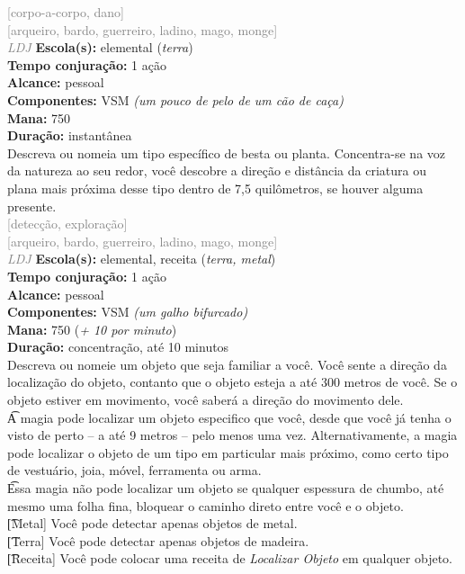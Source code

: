 \documentclass{RPG_Adventure}[2021/10/20]
\begin{document}
{\scriptsize \textcolor{gray}{[corpo-a-corpo, dano]\\}}
{\scriptsize \textcolor{gray}{[arqueiro, bardo, guerreiro, ladino, mago, monge]\\}}
{\tiny \textcolor{gray}{\textit{LDJ}}}\jump{}
{\small \t \textbf{Escola(s):} elemental (\textit{terra})\\\t \textbf{Tempo conjuração:} 1 ação\\\t \textbf{Alcance:} pessoal\\\t \textbf{Componentes:} VSM \textit{(um pouco de pelo de um cão de caça)}\\\t \textbf{Mana:} 750\\\t \textbf{Duração:} instantânea\\}
{\normalsize Descreva ou nomeia um tipo específico de besta ou planta. Concentra-se na voz da natureza ao seu redor, você descobre a direção e distância da criatura ou plana mais próxima desse tipo dentro de 7,5 quilômetros, se houver alguma presente.\\}
{\scriptsize \textcolor{gray}{[detecção, exploração]\\}}
{\scriptsize \textcolor{gray}{[arqueiro, bardo, guerreiro, ladino, mago, monge]\\}}
{\tiny \textcolor{gray}{\textit{LDJ}}}\jump{}
{\small \t \textbf{Escola(s):} elemental, receita (\textit{terra, metal})\\\t \textbf{Tempo conjuração:} 1 ação\\\t \textbf{Alcance:} pessoal\\\t \textbf{Componentes:} VSM \textit{(um galho bifurcado)}\\\t \textbf{Mana:} 750 (\textit{+ 10 por minuto})\\\t \textbf{Duração:} concentração, até 10 minutos\\}
{\normalsize Descreva ou nomeie um objeto que seja familiar a você. Você sente a direção da localização do objeto, contanto que o objeto esteja a até 300 metros de você. Se o objeto estiver em movimento, você saberá a direção do movimento dele.\\\t A magia pode localizar um objeto especifico que você, desde que você já tenha o visto de perto – a até 9 metros – pelo menos uma vez. Alternativamente, a magia pode localizar o objeto de um tipo em particular mais próximo, como certo tipo de vestuário, joia, móvel, ferramenta ou arma.\\\t Essa magia não pode localizar um objeto se qualquer espessura de chumbo, até mesmo uma folha fina, bloquear o caminho direto entre você e o objeto.\\\t [Metal] Você pode detectar apenas objetos de metal.\\\t [Terra] Você pode detectar apenas objetos de madeira.\\\t [Receita] Você pode colocar uma receita de \textit{Localizar Objeto} em qualquer objeto.\\}
\end{document}
